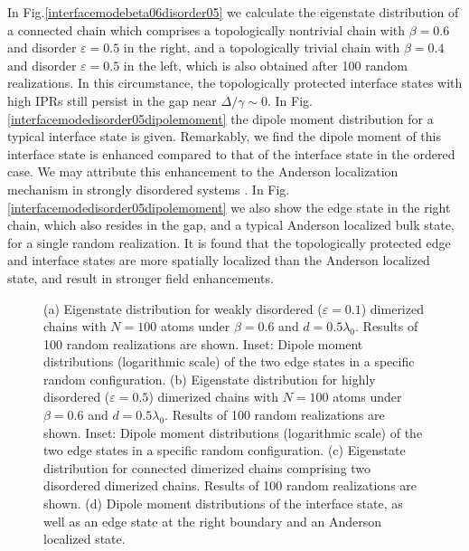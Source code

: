 \documentclass[aps,pra,reprint,groupedaddress,nofootinbib,longbibliography,showpacs]{revtex4-1}
\begin{document}
In Fig.\ref{interfacemodebeta06disorder05} we calculate the eigenstate distribution of a connected chain which comprises a topologically nontrivial chain with $\beta=0.6$ and disorder $\varepsilon=0.5$ in the right, and a topologically trivial chain with $\beta=0.4$ and disorder $\varepsilon=0.5$ in the left, which is also obtained after 100 random realizations. In this circumstance, the topologically protected interface states with high IPRs still persist in the gap near $\Delta/\gamma\sim0$. In Fig.\ref{interfacemodedisorder05dipolemoment} the dipole moment distribution for a typical interface state is given. Remarkably, we find the dipole moment of this interface state is enhanced compared to that of the interface state in the ordered case. We may attribute this enhancement to the Anderson localization mechanism in strongly disordered systems \cite{Skipetrov2014}. In Fig.\ref{interfacemodedisorder05dipolemoment} we also show the edge state in the right chain, which also resides in the gap, and a typical Anderson localized bulk state, for a single random realization. It is found that the topologically protected edge and interface states are more spatially localized than the Anderson localized state, and result in stronger field enhancements.


\begin{figure}[htbp]
\centering
\flushleft
{}
\hspace{0.01in}
\hspace{0.01in}
	
	
	
\caption{ (a) Eigenstate distribution for weakly disordered ($\varepsilon=0.1$) dimerized chains with $N=100$ atoms under $\beta=0.6$ and $d=0.5\lambda_0$. Results of 100 random realizations are shown. Inset:  Dipole moment distributions (logarithmic scale) of the two edge states in a specific random configuration. (b) Eigenstate distribution for highly disordered ($\varepsilon=0.5$) dimerized chains with $N=100$ atoms under $\beta=0.6$ and $d=0.5\lambda_0$. Results of 100 random realizations are shown. Inset: Dipole moment distributions (logarithmic scale) of the two edge states in a specific random configuration. (c) Eigenstate distribution for connected dimerized chains comprising two disordered dimerized chains. Results of 100 random realizations are shown. (d) Dipole moment distributions of the interface state, as well as an edge state at the right boundary and an Anderson localized state.} 
	\label{disorder}
\end{figure}
\end{document}

